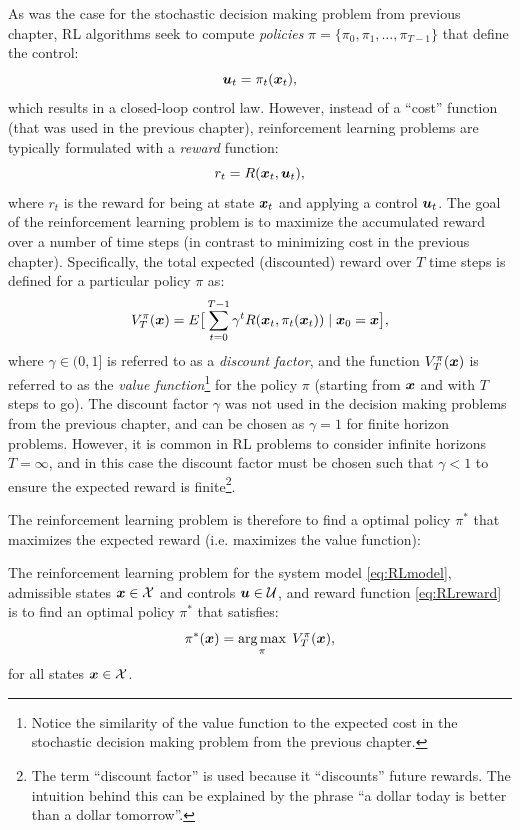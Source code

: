 As was the case for the stochastic decision making problem from previous chapter, RL algorithms seek to compute \textit{policies} $\pi = \{\pi_0, \pi_1, \dots, \pi_{T-1}\}$ that define the control:
\begin{equation} \label{eq:RLpolicy}
\bm{u}_t = \pi_t(\bm{x}_t),
\end{equation}
which results in a closed-loop control law.
However, instead of a ``cost'' function (that was used in the previous chapter), reinforcement learning problems are typically formulated with a \textit{reward} function:
\begin{equation} \label{eq:RLreward}
r_t = R(\bm{x}_t, \bm{u}_t),
\end{equation}
where $r_t$ is the reward for being at state $\bm{x}_t$ and applying a control $\bm{u}_t$. The goal of the reinforcement learning problem is to maximize the accumulated reward over a number of time steps (in contrast to minimizing cost in the previous chapter). Specifically, the total expected (discounted) reward over $T$ time steps is defined for a particular policy $\pi$ as:
\begin{equation} \label{eq:RLvalue}
V_T^\pi(\bm{x}) = E\big[\sum_{t=0}^{T-1} \gamma^tR(\bm{x}_t, \pi_t(\bm{x}_t)) \mid \bm{x}_0 = \bm{x} \big],
\end{equation}
where $\gamma \in (0,1]$ is referred to as a \textit{discount factor}, and the function $V_T^\pi(\bm{x})$ is referred to as the \textit{value function}\footnote{Notice the similarity of the value function to the expected cost in the stochastic decision making problem from the previous chapter.} for the policy $\pi$ (starting from $\bm{x}$ and with $T$ steps to go). The discount factor $\gamma$ was not used in the decision making problems from the previous chapter, and can be chosen as $\gamma = 1$ for finite horizon problems. However, it is common in RL problems to consider infinite horizons $T = \infty$, and in this case the discount factor must be chosen such that $\gamma < 1$ to ensure the expected reward is finite\footnote{The term ``discount factor'' is used because it ``discounts'' future rewards. The intuition behind this can be explained by the phrase ``a dollar today is better than a dollar tomorrow''.}. 

The reinforcement learning problem is therefore to find a optimal policy $\pi^*$ that maximizes the expected reward (i.e. maximizes the value function):
\begin{definition}
The reinforcement learning problem for the system model \eqref{eq:RLmodel}, admissible states $\bm{x} \in \mathcal{X}$ and controls $\bm{u} \in \mathcal{U}$, and reward function \eqref{eq:RLreward} is to find an optimal policy $\pi^*$ that satisfies:
\begin{equation} \label{eq:rlproblem}
\pi^*(\bm{x}) = \underset{\pi}{\arg\max} \:\: V_T^\pi(\bm{x}),
\end{equation}
for all states $\bm{x} \in \mathcal{X}$.
\end{definition}



